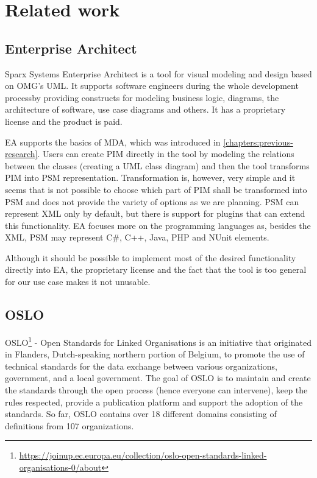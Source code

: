 \chapter{Related work}
\label{chapters:related-work}

\section{Enterprise Architect}

Sparx Systems Enterprise Architect is a tool for visual modeling and design based on OMG's UML. It supports software engineers during the whole development processby providing constructs for modeling business logic, diagrams, the architecture of software, use case diagrams and others. It has a proprietary license and the product is paid.

EA supports the basics of MDA, which was introduced in \autoref{chapters:previous-research}. Users can create PIM directly in the tool by modeling the relations between the classes (creating a UML class diagram) and then the tool transforms PIM into PSM representation. Transformation is, however, very simple and it seems that is not possible to choose which part of PIM shall be transformed into PSM and does not provide the variety of options as we are planning. PSM can represent XML only by default, but there is support for plugins that can extend this functionality. EA focuses more on the programming languages as, besides the XML, PSM may represent C\#, C++, Java, PHP and NUnit elements.

Although it should be possible to implement most of the desired functionality directly into EA, the proprietary license and the fact that the tool is too general for our use case makes it not unusable.

\section{OSLO}

OSLO\footnote{\url{https://joinup.ec.europa.eu/collection/oslo-open-standards-linked-organisations-0/about}} - Open Standards for Linked Organisations is an initiative that originated in Flanders, Dutch-speaking northern portion of Belgium, to promote the use of technical standards for the data exchange between various organizations, government, and a local government. The goal of OSLO is to maintain and create the standards through the open process (hence everyone can intervene), keep the rules respected, provide a publication platform and support the adoption of the standards. So far, OSLO contains over 18 different domains consisting of definitions from 107 organizations.

